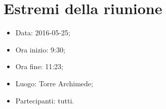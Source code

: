 \documentclass[../RiunioneInterna16-05-25.tex]{subfiles}
\begin{document}
\section{Estremi della riunione}
	\begin{itemize}
		\item Data: 2016-05-25;
		\item Ora inizio: 9:30;
		\item Ora fine: 11:23;
		\item Luogo: Torre Archimede;
		\item Partecipanti: tutti.
	\end{itemize}
\end{document}
